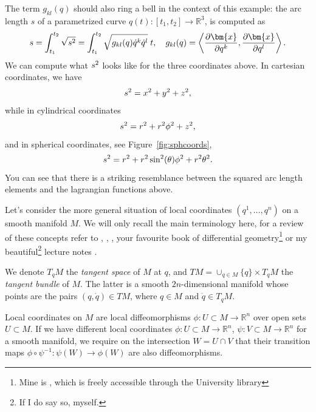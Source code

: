 \documentclass[english,fontsize=11pt,paper=a5,oneside]{scrbook}
\newcommand{\R}{\mathbb{R}}
\newcommand{\bx}{\bm{x}}
\newcommand{\lag}{\langle}
\newcommand{\rag}{\rangle}
\let\d\relax
\DeclareMathOperator{\d}{d}
\theoremstyle{definition}
\begin{document}
The term $g_{kl} (q)$ should also ring a bell in the context of this example: the arc length $s$ of a parametrized curve $q(t) : [t_1,t_2] \to \R^3$, is computed as
\begin{equation}\label{eq:arclen}
    \begin{aligned}
        s = \int_{t_1}^{t_2} \sqrt{\d s^2} = \int_{t_1}^{t_2} \sqrt{g_{kl}(q)\dot q^k \dot q^l} \;\d t,\quad
        g_{kl} (q) = \left\lag\frac{\partial\bx}{\partial q^k}, \frac{\partial \bx}{\partial q^l}\right\rag.
    \end{aligned}
\end{equation}
We can compute what $\d s^2$ looks like for the three coordinates above.
In cartesian coordinates, we have
\begin{equation}
    \d s^2 = \d x^2 + \d y^2 + \d z^2,
\end{equation}
while in cylindrical coordinates
\begin{equation}
    \d s^2 = \d r^2 + r^2 \d \phi^2 + \d z^2,
\end{equation}
and in spherical coordinates, see Figure~\ref{fig:sphcoords},
\begin{equation}\label{eq:spharc}
    \d s^2 = \d r^2 + r^2 \sin^2(\theta) \d \phi^2 + r^2 \d \theta^2.
\end{equation}
You can see that there is a striking resemblance between the squared arc length elements and the lagrangian functions above.

Let's consider the more general situation of local coordinates $(q^1, \ldots, q^n)$ on a smooth manifold $M$.
We will only recall the main terminology here, for a review of these concepts refer to \cite[Chapter 4.18]{book:arnold}, \cite[Appendix A]{book:knauf}, \cite[Chapter 4]{book:marsdenratiu}, your favourite book of differential geometry\footnote{Mine is \cite{book:lee}, which is freely accessible through the University library} or my beautiful\footnote{If I do say so, myself.} lecture notes \cite{lectures:aom:seri}.

We denote $T_q M$ the \emph{tangent space} of $M$ at $q$, and $TM = \cup_{q\in M}\{q\}\times T_q M$ the \emph{tangent bundle} of $M$. The latter is a smooth $2n$-dimensional manifold whose points are the pairs $(q,\dot q)\in TM$, where $q\in M$ and $\dot q\in T_q M$.

Local coordinates on $M$ are local diffeomorphisms $\phi:U\subset M\to \R^n$ over open sets $U\subset M$. If we have different local coordinates $\phi:U\subset M\to\R^n$, $\psi:V\subset M\to\R^n$ for a smooth manifold, we require on the intersection $W=U\cap V$ that their transition maps $\phi\circ\psi^{-1}:\psi(W)\to\phi(W)$ are also diffeomorphisms.
\end{document}
